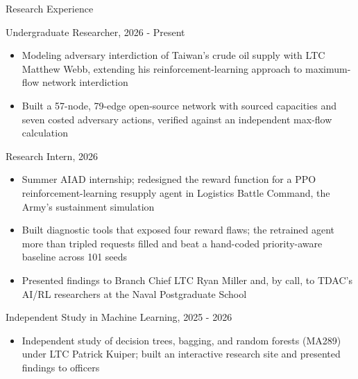 \documentclass{resume}
\begin{document}
\begin{rSection}{Research Experience}\itemsep -1pt

\begin{rSubsection}{Undergraduate Researcher, }{2026 - Present}{}
\vspace{-3pt}
\begin{itemize}
\setlength\itemsep{-1.5ex}
    \item Modeling adversary interdiction of Taiwan's crude oil supply with LTC Matthew Webb, extending his reinforcement-learning approach to maximum-flow network interdiction
    \item Built a 57-node, 79-edge open-source network with sourced capacities and seven costed adversary actions, verified against an independent max-flow calculation
\end{itemize}
\end{rSubsection}

\begin{rSubsection}{Research Intern, }{2026}{}
\vspace{-3pt}
\begin{itemize}
\setlength\itemsep{-1.5ex}
    \item Summer AIAD internship; redesigned the reward function for a PPO reinforcement-learning resupply agent in Logistics Battle Command, the Army's sustainment simulation
    \item Built diagnostic tools that exposed four reward flaws; the retrained agent more than tripled requests filled and beat a hand-coded priority-aware baseline across 101 seeds
    \item Presented findings to Branch Chief LTC Ryan Miller and, by call, to TDAC's AI/RL researchers at the Naval Postgraduate School
\end{itemize}
\end{rSubsection}

\begin{rSubsection}{Independent Study in Machine Learning, }{2025 - 2026}{}
\vspace{-3pt}
\begin{itemize}
\setlength\itemsep{-1.5ex}
    \item Independent study of decision trees, bagging, and random forests (MA289) under LTC Patrick Kuiper; built an interactive research site and presented findings to officers
\end{itemize}
\end{rSubsection}

\vspace{-3pt}
\end{rSection}
\end{document}
